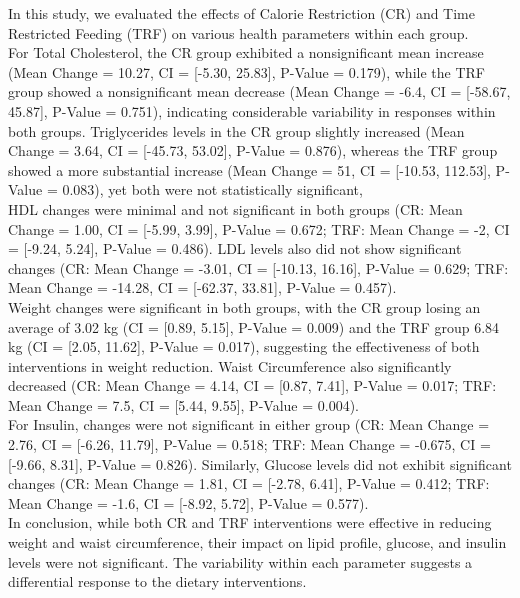 \documentclass[journal,article,submit,pdftex,moreauthors]{Definitions/mdpi}
\begin{document}
{In this study, we evaluated the effects of Calorie Restriction (CR) and Time Restricted Feeding (TRF) on various health parameters within each group.\\

For Total Cholesterol, the CR group exhibited a nonsignificant mean increase (Mean Change = 10.27, CI = [-5.30, 25.83], P-Value = 0.179), while the TRF group showed a nonsignificant mean decrease (Mean Change = -6.4, CI = [-58.67, 45.87], P-Value = 0.751), indicating considerable variability in responses within both groups. Triglycerides levels in the CR group slightly increased (Mean Change = 3.64, CI = [-45.73, 53.02], P-Value = 0.876), whereas the TRF group showed a more substantial increase (Mean Change = 51, CI = [-10.53, 112.53], P-Value = 0.083), yet both were not statistically significant, \\

HDL changes were minimal and not significant in both groups (CR: Mean Change = 1.00, CI = [-5.99, 3.99], P-Value = 0.672; TRF: Mean Change = -2, CI = [-9.24, 5.24], P-Value = 0.486). LDL levels also did not show significant changes (CR: Mean Change = -3.01, CI = [-10.13, 16.16], P-Value = 0.629; TRF: Mean Change = -14.28, CI = [-62.37, 33.81], P-Value = 0.457).\\

Weight changes were significant in both groups, with the CR group losing an average of 3.02 kg (CI = [0.89, 5.15], P-Value = 0.009) and the TRF group 6.84 kg (CI = [2.05, 11.62], P-Value = 0.017), suggesting the effectiveness of both interventions in weight reduction. Waist Circumference also significantly decreased (CR: Mean Change = 4.14, CI = [0.87, 7.41], P-Value = 0.017; TRF: Mean Change = 7.5, CI = [5.44, 9.55], P-Value = 0.004).\\

For Insulin, changes were not significant in either group (CR: Mean Change = 2.76, CI = [-6.26, 11.79], P-Value = 0.518; TRF: Mean Change = -0.675, CI = [-9.66, 8.31], P-Value = 0.826). Similarly, Glucose levels did not exhibit significant changes (CR: Mean Change = 1.81, CI = [-2.78, 6.41], P-Value = 0.412; TRF: Mean Change = -1.6, CI = [-8.92, 5.72], P-Value = 0.577).\\

In conclusion, while both CR and TRF interventions were effective in reducing weight and waist circumference, their impact on lipid profile, glucose, and insulin levels were not significant. The variability within each parameter suggests a differential response to the dietary interventions.\\

}
\end{document}
